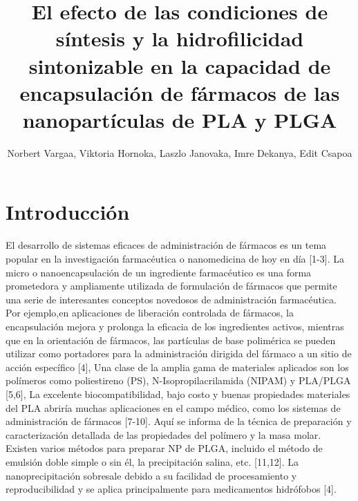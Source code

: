 \documentclass[10pt,letterpaper]{article}
\title{El efecto de las condiciones de síntesis y la hidrofilicidad sintonizable en la capacidad de encapsulación de fármacos de las nanopartículas de PLA y PLGA}
\date{}
\author{Norbert Vargaa, Viktoria Hornoka, Laszlo Janovaka, Imre Dekanya, Edit Csapoa}
\begin{document}
	\maketitle
	
		\section{Introducción}
	\begin{multicols}{2}
	
	El desarrollo de sistemas  eficaces de administración de  fármacos  es  un  tema popular en la investigación farmacéutica  o  nanomedicina de hoy en  día  [1-3]. La    micro  o  nanoencapsulación  de  un  ingrediente farmacéutico  es   una  forma prometedora y ampliamente  utilizada de formulación  de  fármacos que permite  una  serie de interesantes conceptos novedosos   de  administración farmacéutica.  Por    ejemplo,en  aplicaciones de liberación controlada  de          fármacos, la  encapsulación mejora y prolonga la eficacia de los  ingredientes activos,   mientras que  en  la  orientación de   fármacos, las partículas de base polimérica se pueden  utilizar  como  portadores  para  la  administración  dirigida  del  fármaco a un sitio de acción específico [4],  Una  clase  de  la  amplia  gama  de  materiales  aplicados  son  los  polímeros   como  poliestireno  (PS), N-Isopropilacrilamida  (NIPAM) y PLA/PLGA [5,6],  La  excelente  biocompatibilidad,  bajo  costo  y   buenas propiedades  materiales del PLA  abriría   muchas  aplicaciones  en el campo médico,  como  los  sistemas de administración  de fármacos    [7-10]. Aquí se    informa de la técnica  de  preparación  y  caracterización detallada  de las propiedades del polímero  y  la masa molar.  Existen   varios  métodos  para preparar NP de PLGA,  incluido el  método de emulsión doble  simple  o sin él,  la precipitación salina,  etc. [11,12].   La nanoprecipitación sobresale debido  a  su  facilidad  de  procesamiento  y  reproducibilidad  y se aplica principalmente  para medicamentos hidrófobos    [4].  

\end{multicols}
\end{document}
